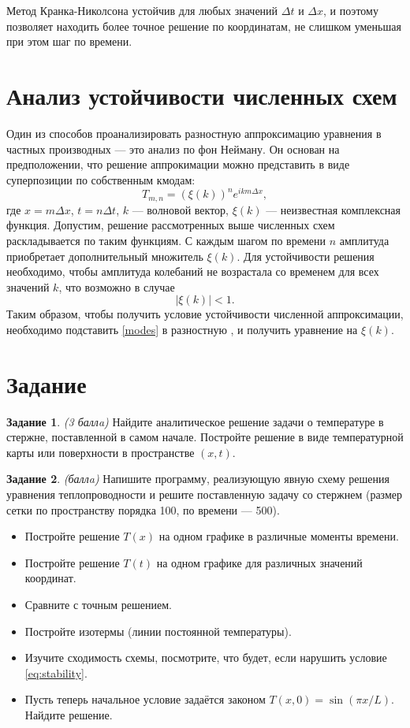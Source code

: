 \documentclass[12pt]{article}
\newcommand{\task}[2]{\vspace{6pt}
\textbf{Задание #1}. #2 %
}
\begin{document}
Метод Кранка-Николсона устойчив для любых значений $\Delta t$ и $\Delta x$, и поэтому позволяет находить более точное решение по координатам, не слишком уменьшая при этом шаг по времени.

\section*{Анализ устойчивости численных схем}
Один из способов проанализировать разностную аппроксимацию уравнения в частных производных --- это анализ по фон Нейману. Он основан на предположении, что решение аппрокимации можно представить в виде суперпозиции по собственным кмодам:
\begin{equation}
T_{m,n}=(\xi(k))^n e^{ikm\Delta x},
\label{eq:modes}
\end{equation}
где $x=m\Delta x$, $t=n\Delta t$, $k$ --- волновой вектор, $\xi(k)$ --- неизвестная комплексная функция. Допустим, решение рассмотренных выше численных схем раскладывается по таким функциям. С каждым шагом по времени $n$ амплитуда приобретает дополнительный множитель $\xi(k)$. Для устойчивости решения необходимо, чтобы амплитуда колебаний не возрастала со временем для всех значений $k$, что возможно в случае
\begin{equation}
|\xi(k)|<1.
\end{equation}
Таким образом, чтобы получить условие устойчивости численной аппроксимации, необходимо подставить \eqref{modes} в разностную , и получить уравнение на $\xi(k)$.

\section*{Задание}

\task{1}{\textit{(3 баллa)}} Найдите аналитическое решение задачи о температуре в стержне, поставленной в самом начале. Постройте решение в виде температурной карты или поверхности в пространстве $(x,t)$.

\task{2}{\textit{(баллa)}} Напишите программу, реализующую явную схему решения уравнения теплопроводности и решите поставленную задачу со стержнем (размер сетки по пространству порядка 100, по времени --- 500).
\begin{itemize}
\item Постройте решение $T(x)$ на одном графике в различные моменты времени.
\item Постройте решение $T(t)$ на одном графике для различных значений координат.
\item Сравните с точным решением.
\item Постройте изотермы (линии постоянной температуры).
\item Изучите сходимость схемы, посмотрите, что будет, если нарушить условие \eqref{eq:stability}.
\item Пусть теперь начальное условие задаётся законом $T(x,0)=\sin(\pi x/L)$. Найдите решение.
\end{itemize}
\end{document}
